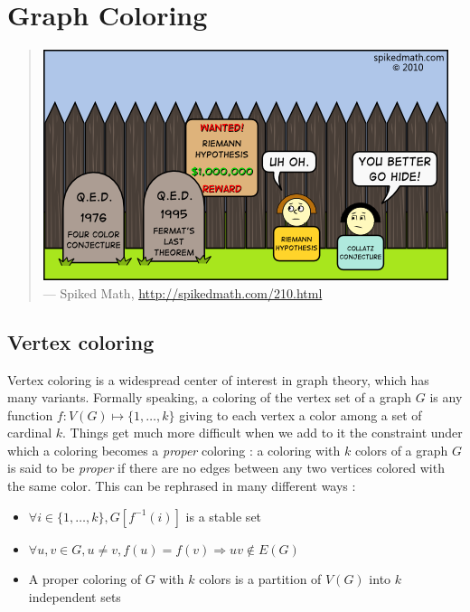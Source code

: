 
\chapter{Graph Coloring}
\label{chap:graph_coloring}

\begin{quote}
\includegraphics[scale=1.0]{image/four-color-conjecture-qed} \\
\noindent
--- Spiked Math,
\url{http://spikedmath.com/210.html}
\end{quote}



\section{Vertex coloring}

Vertex coloring is a widespread center of interest in graph theory, which has many variants. Formally speaking, a coloring of the vertex set of a graph $G$ is any function $f:V(G)\mapsto \{1,\dots,k\}$ giving to each vertex a color among a set of cardinal $k$. Things get much more difficult when we add to it the constraint under which a coloring becomes a {\it proper} coloring : a coloring with $k$ colors of a graph $G$ is said to be {\it proper} if there are no edges between any two vertices colored with the same color. This can be rephrased in many different ways :
\begin{itemize}
\item $\forall i\in \{1,\dots,k\}, G[f^{-1}(i)]$ is a stable set
\item $\forall u,v\in G,u\neq v, f(u)=f(v)\Rightarrow uv\not \in E(G)$
\item A proper coloring of $G$ with $k$ colors is a partition of $V(G)$ into $k$ independent sets
\end{itemize}

